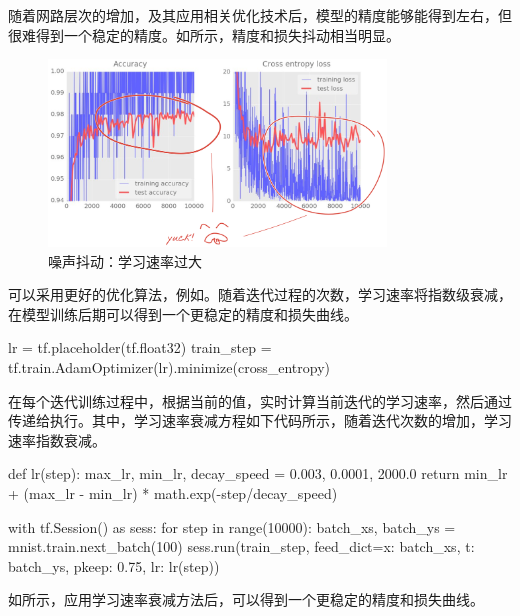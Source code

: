 \begin{content}
\begin{content}
随着网路层次的增加，及其应用相关优化技术后，模型的精度能够能得到左右，但很难得到一个稳定的精度。如所示，精度和损失抖动相当明显。

\begin{figure}[H]
\centering
\includegraphics[width=0.8\textwidth]{figures/mnist-lr-too-larger.png}
\caption{噪声抖动：学习速率过大}
 \label{fig:mnist-lr-too-larger}
\end{figure}

可以采用更好的优化算法，例如。随着迭代过程的次数，学习速率将指数级衰减，在模型训练后期可以得到一个更稳定的精度和损失曲线。

\begin{leftbar}
\begin{python}
lr = tf.placeholder(tf.float32)
train_step = tf.train.AdamOptimizer(lr).minimize(cross_entropy)
\end{python}
\end{leftbar}

在每个迭代训练过程中，根据当前的值，实时计算当前迭代的学习速率，然后通过传递给执行。其中，学习速率衰减方程如下代码所示，随着迭代次数的增加，学习速率指数衰减。

\begin{leftbar}
\begin{python}
def lr(step):
  max_lr, min_lr, decay_speed = 0.003, 0.0001, 2000.0
  return min_lr + (max_lr - min_lr) * math.exp(-step/decay_speed)

with tf.Session() as sess:
  for step in range(10000):
    batch_xs, batch_ys = mnist.train.next_batch(100)
    sess.run(train_step, 
      feed_dict={x: batch_xs, t: batch_ys, pkeep: 0.75, lr: lr(step)})
\end{python}
\end{leftbar}

如所示，应用学习速率衰减方法后，可以得到一个更稳定的精度和损失曲线。


\end{content}
\end{content}
